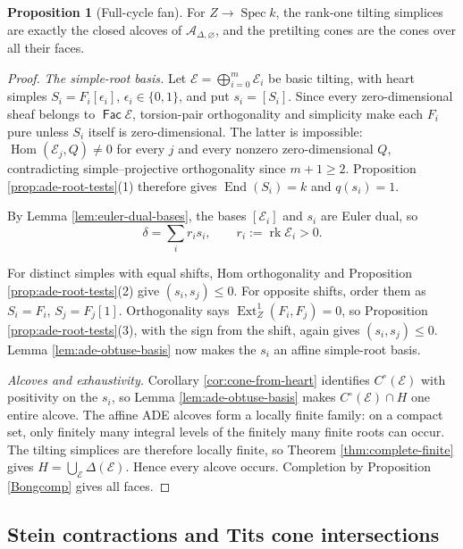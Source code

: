 \documentclass[a4paper,reqno]{amsart}
\def\E{\mathcal{E}}
\DeclareMathOperator{\Fac}{\mathsf{Fac}}
\DeclareMathOperator{\Hom}{Hom}
\DeclareMathOperator{\End}{End}
\DeclareMathOperator{\Ext}{Ext}
\DeclareMathOperator{\Spec}{Spec}
\DeclareMathOperator{\rk}{rk}
\theoremstyle{definition}
\newtheorem{Prop}[Thm]{Proposition}
\begin{document}
\begin{Prop}[Full-cycle fan]\label{prop:full-ade-fan}
For $Z\to\Spec k$, the rank-one tilting simplices are exactly the closed alcoves of $\mathscr A_{\Delta,\varnothing}$, and the pretilting cones are the cones over all their faces.
\end{Prop}
\begin{proof}
\emph{The simple-root basis.}
Let $\E=\bigoplus_{i=0}^m\E_i$ be basic tilting, with heart simples $S_i=F_i[\epsilon_i]$, $\epsilon_i\in\{0,1\}$, and put $s_i=[S_i]$. Since every zero-dimensional sheaf belongs to $\Fac\E$, torsion-pair orthogonality and simplicity make each $F_i$ pure unless $S_i$ itself is zero-dimensional. The latter is impossible: $\Hom(\E_j,Q)\ne0$ for every $j$ and every nonzero zero-dimensional $Q$, contradicting simple--projective orthogonality since $m+1\ge2$. Proposition \ref{prop:ade-root-tests}(1) therefore gives $\End(S_i)=k$ and $q(s_i)=1$.

By Lemma \ref{lem:euler-dual-bases}, the bases $[\E_i]$ and $s_i$ are Euler dual, so
\begin{equation}\label{eq:ade-positive-point-class}
\delta=\sum_i r_i s_i,\qquad r_i:=\rk\E_i>0.
\end{equation}

For distinct simples with equal shifts, Hom orthogonality and Proposition \ref{prop:ade-root-tests}(2) give $(s_i,s_j)\le0$. For opposite shifts, order them as $S_i=F_i$, $S_j=F_j[1]$. Orthogonality says $\Ext_Z^1(F_i,F_j)=0$, so Proposition \ref{prop:ade-root-tests}(3), with the sign from the shift, again gives $(s_i,s_j)\le0$. Lemma \ref{lem:ade-obtuse-basis} now makes the $s_i$ an affine simple-root basis.

\emph{Alcoves and exhaustivity.}
Corollary \ref{cor:cone-from-heart} identifies $C^\circ(\E)$ with positivity on the $s_i$, so Lemma \ref{lem:ade-obtuse-basis} makes $C^\circ(\E)\cap H$ one entire alcove. The affine ADE alcoves form a locally finite family: on a compact set, only finitely many integral levels of the finitely many finite roots can occur. The tilting simplices are therefore locally finite, so Theorem \ref{thm:complete-finite} gives $H=\bigcup_\E\Delta(\E)$. Hence every alcove occurs. Completion by Proposition \ref{Bongcomp} gives all faces.
\end{proof}

\subsection{Stein contractions and Tits cone intersections}\label{sec:ade-stein}
\end{document}
